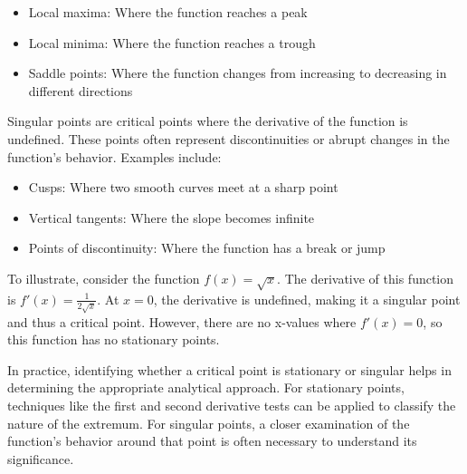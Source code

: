 \documentclass{article}
\begin{document}
\begin{itemize}
\item Local maxima: Where the function reaches a peak
\item Local minima: Where the function reaches a trough
\item Saddle points: Where the function changes from increasing to decreasing in different directions
\end{itemize}

Singular points are critical points where the derivative of the function is undefined. These points often represent discontinuities or abrupt changes in the function's behavior. Examples include:

\begin{itemize}
\item Cusps: Where two smooth curves meet at a sharp point
\item Vertical tangents: Where the slope becomes infinite
\item Points of discontinuity: Where the function has a break or jump
\end{itemize}

To illustrate, consider the function \(f(x) = \sqrt{x}\). The derivative of this function is \(f'(x) = \frac{1}{2\sqrt{x}}\). At \(x = 0\), the derivative is undefined, making it a singular point and thus a critical point. However, there are no x-values where \(f'(x) = 0\), so this function has no stationary points.

In practice, identifying whether a critical point is stationary or singular helps in determining the appropriate analytical approach. For stationary points, techniques like the first and second derivative tests can be applied to classify the nature of the extremum. For singular points, a closer examination of the function's behavior around that point is often necessary to understand its significance.
\end{document}
